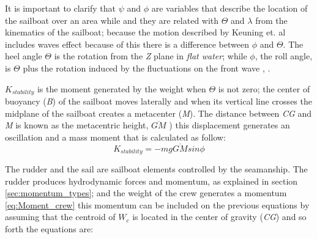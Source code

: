 
It is important to clarify that $\psi$ and $\phi$ are variables that describe the location of the sailboat over an area while and they are related with $\Theta$ and $\lambda$ from the kinematics of the sailboat; because the motion described by Keuning et. al \cite{keuning2004mathematical} includes waves effect because of this there is a difference between $\phi$ and $\Theta$. The heel angle $\Theta$ is the rotation from the \textit{Z} plane in \textit{flat water}; while $\phi$, the roll angle, is $\Theta$ plus the rotation induced by the fluctuations on the front wave \cite{kimball2009physics}, \cite{denny2009float}. \par 
\textit{ $ K_{stability} $ } is the moment generated by the weight when $\Theta$ is not zero; the center of buoyancy (\textit{B}) of the sailboat moves laterally and when its vertical line crosses the midplane of the sailboat creates a metacenter (\textit{M}). The distance between \textit{CG} and \textit{M} is known as the metacentric height, \textit{$\overline{GM}$} ) \cite{patterson2014ship} this displacement generates an oscillation and a mass moment that is calculated as follow:
\begin{equation} \label{eq:k_stability}
    K_{stability}=-mg\overline{GM} sin \phi 
\end{equation}


The rudder and the sail are sailboat elements controlled by the seamanship. 
The rudder produces hydrodynamic forces and momentum, as explained in section \ref{sec:momentum_types}; and the weight of the crew generates a momentum \ref{eq:Moment_crew} 
this momentum can be included on the previous equations by assuming that the centroid of $W_{c}$ is located in the center of gravity (\textit{CG}) and so forth the equations are:\par

